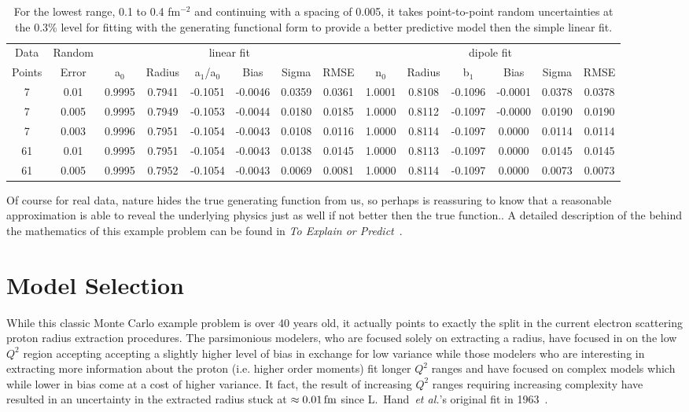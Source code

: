 \documentclass[10pt,aps,prc,twocolumn]{revtex4-1}
\begin{document}
\begin{table}
\caption{For the lowest range, 0.1 to 0.4 fm$^{-2}$ and continuing with a spacing of 0.005, 
it takes point-to-point random uncertainties at the 0.3\% level for fitting with the generating
functional form to provide a better predictive model then the simple linear fit.}
\begin{tabular}{cc|cccccc|cccccc} \hline
Data   & Random   & \multicolumn{6}{c|}{linear fit}                       & \multicolumn{6}{c}{dipole fit}            \\ 
Points & Error    & a$_0$ & Radius&a$_1$/a$_0$&  Bias  & Sigma &  RMSE  & n$_0$ & Radius& b$_1$  &  Bias  & Sigma &  RMSE   \\  \hline
7      & 0.01     & 0.9995& 0.7941& -0.1051& -0.0046& 0.0359& 0.0361 & 1.0001& 0.8108& -0.1096& -0.0001& 0.0378& 0.0378  \\ 
7      & 0.005    & 0.9995& 0.7949& -0.1053& -0.0044& 0.0180& 0.0185 & 1.0000& 0.8112& -0.1097& -0.0000& 0.0190& 0.0190  \\
7      & 0.003    & 0.9996& 0.7951& -0.1054& -0.0043& 0.0108& 0.0116 & 1.0000& 0.8114& -0.1097&  0.0000& 0.0114& 0.0114  \\
61     & 0.01     & 0.9995& 0.7951& -0.1054& -0.0043& 0.0138& 0.0145 & 1.0000& 0.8113& -0.1097&  0.0000& 0.0145& 0.0145  \\ 
61     & 0.005     & 0.9995& 0.7952& -0.1054& -0.0043& 0.0069& 0.0081 & 1.0000& 0.8114& -0.1097&  0.0000& 0.0073& 0.0073  \\ \hline
\end{tabular}
\label{simpleVSperfect}
\end{table}

Of course for real data, nature hides the true generating function from us, so perhaps is reassuring to know
that a reasonable approximation is able to reveal the underlying physics just as well if not better then the
true function..   A detailed description of the  behind the mathematics of this example problem can be 
found in {\it{To Explain or Predict}}~\cite{Shmueli:2010}.


\section{Model Selection}

While this classic Monte Carlo example problem is over 40 years old, it actually points to exactly the split in 
the current electron scattering proton radius extraction procedures.     The parsimonious modelers, who are 
focused solely on extracting a radius, have focused in on the low $Q^2$ region accepting accepting a slightly higher 
level of bias in exchange for low variance while those modelers who are interesting in extracting more information 
about the proton (i.e. higher order moments) fit longer $Q^2$ ranges and have
focused on complex models which while lower in bias come at a cost of higher variance.  
It fact, the result of increasing $Q^2$ ranges requiring increasing complexity have resulted in
an uncertainty in the extracted radius 
stuck at $\approx \unit[0.01]{fm}$ since L.~Hand~\textit{et al.}'s original fit in 1963~\cite{Hand:1963zz}.
\end{document}
